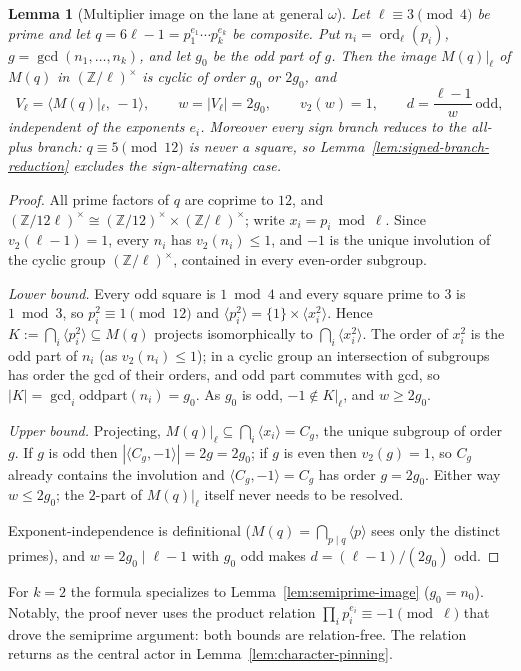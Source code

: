 \documentclass[11pt]{article}
\theoremstyle{plain}
\newtheorem{lemma}[theorem]{Lemma}
\theoremstyle{definition}
\theoremstyle{remark}
\newcommand{\Z}{\mathbb Z}
\newcommand{\ord}{\operatorname{ord}}
\begin{document}
\begin{lemma}[Multiplier image on the lane at general $\omega$]
\label{lem:lane-image}
Let $\ell\equiv3\pmod4$ be prime and let
$q=6\ell-1=p_1^{e_1}\cdots p_k^{e_k}$ be composite.  Put
$n_i=\ord_\ell(p_i)$, $g=\gcd(n_1,\dots,n_k)$, and let $g_0$ be the odd
part of $g$.  Then the image $M(q)|_\ell$ of $M(q)$ in
$(\Z/\ell)^\times$ is cyclic of order $g_0$ or $2g_0$, and
\[
  V_\ell=\bigl\langle M(q)|_\ell,\,-1\bigr\rangle,\qquad
  w=|V_\ell|=2g_0,\qquad v_2(w)=1,\qquad
  d=\frac{\ell-1}{w}\ \text{odd},
\]
independent of the exponents $e_i$.  Moreover every sign branch reduces
to the all-plus branch: $q\equiv5\pmod{12}$ is never a square, so
Lemma~\ref{lem:signed-branch-reduction} excludes the sign-alternating
case.
\end{lemma}

\begin{proof}
All prime factors of $q$ are coprime to $12$, and
$(\Z/12\ell)^\times\cong(\Z/12)^\times\times(\Z/\ell)^\times$; write
$x_i=p_i\bmod\ell$.  Since $v_2(\ell-1)=1$, every $n_i$ has
$v_2(n_i)\le1$, and $-1$ is the unique involution of the cyclic group
$(\Z/\ell)^\times$, contained in every even-order subgroup.

\emph{Lower bound.}  Every odd square is $1\bmod4$ and every square
prime to $3$ is $1\bmod3$, so $p_i^2\equiv1\pmod{12}$ and
$\langle p_i^2\rangle=\{1\}\times\langle x_i^2\rangle$.  Hence
$K:=\bigcap_i\langle p_i^2\rangle\subseteq M(q)$ projects isomorphically
to $\bigcap_i\langle x_i^2\rangle$.  The order of $x_i^2$ is the odd
part of $n_i$ (as $v_2(n_i)\le1$); in a cyclic group an intersection of
subgroups has order the gcd of their orders, and odd part commutes with
gcd, so $|K|=\gcd_i\mathrm{oddpart}(n_i)=g_0$.  As $g_0$ is odd,
$-1\notin K|_\ell$, and $w\ge2g_0$.

\emph{Upper bound.}  Projecting,
$M(q)|_\ell\subseteq\bigcap_i\langle x_i\rangle=C_g$, the unique
subgroup of order $g$.  If $g$ is odd then
$|\langle C_g,-1\rangle|=2g=2g_0$; if $g$ is even then $v_2(g)=1$, so
$C_g$ already contains the involution and
$\langle C_g,-1\rangle=C_g$ has order $g=2g_0$.  Either way
$w\le2g_0$; the $2$-part of $M(q)|_\ell$ itself never needs to be
resolved.

Exponent-independence is definitional
($M(q)=\bigcap_{p\mid q}\langle p\rangle$ sees only the distinct
primes), and $w=2g_0\mid\ell-1$ with $g_0$ odd makes
$d=(\ell-1)/(2g_0)$ odd.
\end{proof}

For $k=2$ the formula specializes to
Lemma~\ref{lem:semiprime-image} ($g_0=n_0$).  Notably, the proof never
uses the product relation $\prod_i p_i^{e_i}\equiv-1\pmod\ell$ that
drove the semiprime argument: both bounds are relation-free.  The
relation returns as the central actor in
Lemma~\ref{lem:character-pinning}.
\end{document}
